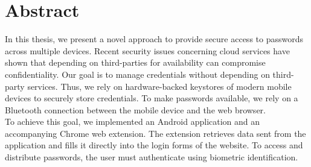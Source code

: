 
\section*{Abstract} \label{cha:abstract}
In this thesis, we present a novel approach to provide secure access to passwords across multiple devices. Recent security issues concerning cloud services have shown that depending on third-parties for availability can compromise confidentiality. Our goal is to manage credentials without depending on third-party services. Thus, we rely on hardware-backed keystores of modern mobile devices to securely store credentials. To make passwords available, we rely on a Bluetooth connection between the mobile device and the web browser. \\
To achieve this goal, we implemented an Android application and an accompanying Chrome web extension. The extension retrieves data sent from the application and fills it directly into the login forms of the website. To access and distribute passwords, the user must authenticate using biometric identification.

